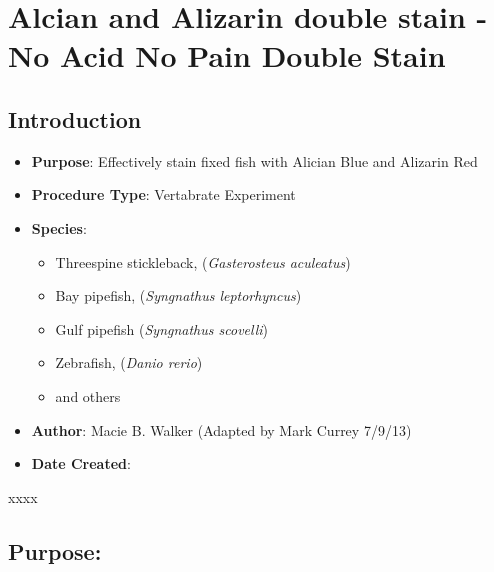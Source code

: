 \documentclass[
  letterpaper,
  DIV=11,
  numbers=noendperiod]{scrreprt}
\providecommand{\tightlist}{%
  \setlength{\itemsep}{0pt}\setlength{\parskip}{0pt}}\usepackage{longtable,booktabs,array}
\begin{document}
\hypertarget{sec-vert_exp-doublestain}{%
\chapter{Alcian and Alizarin double stain - No Acid No Pain Double
Stain}\label{sec-vert_exp-doublestain}}

\hypertarget{introduction-72}{%
\section{Introduction}\label{introduction-72}}

\begin{itemize}
\tightlist
\item
  \textbf{Purpose}: Effectively stain fixed fish with Alician Blue and
  Alizarin Red
\item
  \textbf{Procedure Type}: Vertabrate Experiment
\item
  \textbf{Species}:

  \begin{itemize}
  \tightlist
  \item
    Threespine stickleback, (\emph{Gasterosteus aculeatus})
  \item
    Bay pipefish, (\emph{Syngnathus leptorhyncus})
  \item
    Gulf pipefish (\emph{Syngnathus scovelli})
  \item
    Zebrafish, (\emph{Danio rerio})
  \item
    and others
  \end{itemize}
\item
  \textbf{Author}: Macie B. Walker (Adapted by Mark Currey 7/9/13)
\item
  \textbf{Date Created}:
\end{itemize}

\begin{tcolorbox}[enhanced jigsaw, rightrule=.15mm, title=\textcolor{quarto-callout-warning-color}{\faExclamationTriangle}\hspace{0.5em}{NOTES}, titlerule=0mm, opacitybacktitle=0.6, toprule=.15mm, bottomrule=.15mm, opacityback=0, left=2mm, colframe=quarto-callout-warning-color-frame, breakable, coltitle=black, colback=white, colbacktitle=quarto-callout-warning-color!10!white, bottomtitle=1mm, leftrule=.75mm, toptitle=1mm, arc=.35mm]

xxxx

\end{tcolorbox}

\hypertarget{purpose}{%
\section{Purpose:}\label{purpose}}
\end{document}
